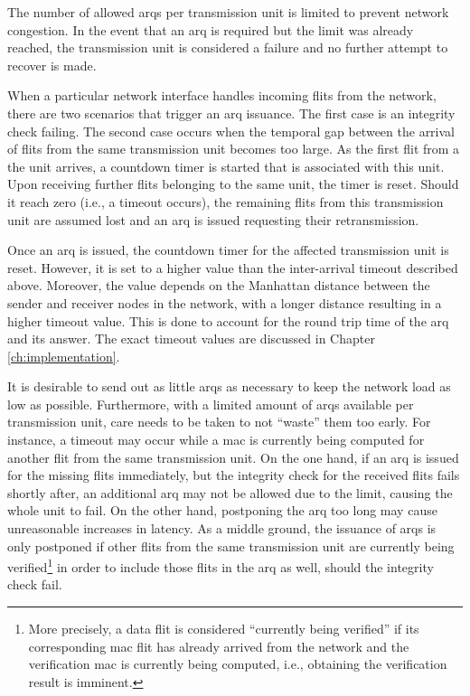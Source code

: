 The number of allowed \glspl{arq} per transmission unit is limited to prevent network congestion. In the event that an \gls{arq} is required but the limit
was already reached, the transmission unit is considered a failure and no further attempt to recover is made.

When a particular network interface handles incoming flits from the network, there are two scenarios that trigger an \gls{arq} issuance. The first
case is an integrity check failing. The second case occurs when the temporal gap between the arrival of flits from the same transmission unit becomes
too large. As the first flit from a the unit arrives, a countdown timer is started that is associated with this unit. Upon receiving further flits
belonging to the same unit, the timer is reset. Should it reach zero (i.e., a timeout occurs), the remaining flits from this transmission unit are
assumed lost and an \gls{arq} is issued requesting their retransmission.

Once an \gls{arq} is issued, the countdown timer for the affected transmission unit is reset. However, it is set to a higher value than the
inter-arrival timeout described above. Moreover, the value depends on the Manhattan distance between the sender and receiver nodes in the network,
with a longer distance resulting in a higher timeout value. This is done to account for the round trip time of the \gls{arq} and its
answer. The exact timeout values are discussed in Chapter \ref{ch:implementation}.

It is desirable to send out as little \glspl{arq} as necessary to keep the network load as low as possible. Furthermore, with a limited
amount of \glspl{arq} available per transmission unit, care needs to be taken to not \enquote{waste} them too early. For instance, a timeout may
occur while a \gls{mac} is currently being computed for another flit from the same transmission unit. On the one hand, if an \gls{arq} is issued for
the missing flits immediately, but the integrity check for the received flits fails shortly after, an additional \gls{arq} may not be allowed due to
the limit, causing the whole unit to fail. On the other hand, postponing the \gls{arq} too long may cause unreasonable increases in latency. As a
middle ground, the issuance of \glspl{arq} is only postponed if other flits from the same transmission unit are currently being verified\footnote{More
precisely, a data flit is considered \enquote{currently being verified} if its corresponding \gls{mac} flit has already arrived from the network and
the verification \gls{mac} is currently being computed, i.e., obtaining the verification result is imminent.} in order to include those flits in the
\gls{arq} as well, should the integrity check fail.

